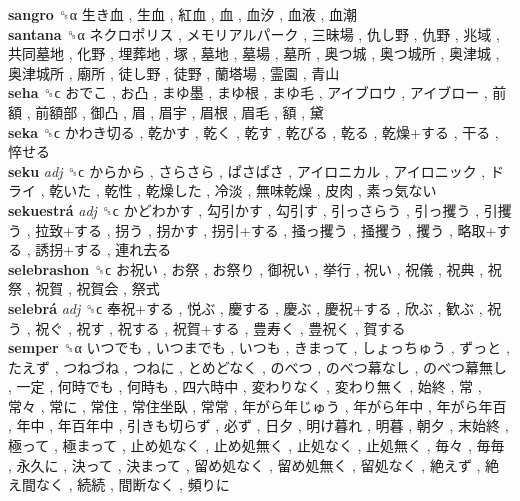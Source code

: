 \textbf{sangro} ␝α   生き血 ,  生血 ,  紅血 ,  血 ,  血汐 ,  血液 ,  血潮   \\
\textbf{santana} ␝α   ネクロポリス ,  メモリアルパーク ,  三昧場 ,  仇し野 ,  仇野 ,  兆域 ,  共同墓地 ,  化野 ,  埋葬地 ,  塚 ,  墓地 ,  墓場 ,  墓所 ,  奥つ城 ,  奥つ城所 ,  奥津城 ,  奥津城所 ,  廟所 ,  徒し野 ,  徒野 ,  蘭塔場 ,  霊園 ,  青山   \\
\textbf{seha} ␝ϲ   おでこ ,  お凸 ,  まゆ墨 ,  まゆ根 ,  まゆ毛 ,  アイブロウ ,  アイブロー ,  前額 ,  前額部 ,  御凸 ,  眉 ,  眉宇 ,  眉根 ,  眉毛 ,  額 ,  黛   \\
\textbf{seka} ␝ϲ   かわき切る ,  乾かす ,  乾く ,  乾す ,  乾びる ,  乾る ,  乾燥+する ,  干る ,  悴せる   \\
\textbf{seku} \emph{adj}  ␝ϲ   からから ,  さらさら ,  ぱさぱさ ,  アイロニカル ,  アイロニック ,  ドライ ,  乾いた ,  乾性 ,  乾燥した ,  冷淡 ,  無味乾燥 ,  皮肉 ,  素っ気ない   \\
\textbf{sekuestrá} \emph{adj}  ␝ϲ   かどわかす ,  勾引かす ,  勾引す ,  引っさらう ,  引っ攫う ,  引攫う ,  拉致+する ,  拐う ,  拐かす ,  拐引+する ,  掻っ攫う ,  掻攫う ,  攫う ,  略取+する ,  誘拐+する ,  連れ去る   \\
\textbf{selebrashon} ␝ϲ   お祝い ,  お祭 ,  お祭り ,  御祝い ,  挙行 ,  祝い ,  祝儀 ,  祝典 ,  祝祭 ,  祝賀 ,  祝賀会 ,  祭式   \\
\textbf{selebrá} \emph{adj}  ␝ϲ   奉祝+する ,  悦ぶ ,  慶する ,  慶ぶ ,  慶祝+する ,  欣ぶ ,  歓ぶ ,  祝う ,  祝ぐ ,  祝す ,  祝する ,  祝賀+する ,  豊寿く ,  豊祝く ,  賀する   \\
\textbf{semper} ␝α   いつでも ,  いつまでも ,  いつも ,  きまって ,  しょっちゅう ,  ずっと ,  たえず ,  つねづね ,  つねに ,  とめどなく ,  のべつ ,  のべつ幕なし ,  のべつ幕無し ,  一定 ,  何時でも ,  何時も ,  四六時中 ,  変わりなく ,  変わり無く ,  始終 ,  常 ,  常々 ,  常に ,  常住 ,  常住坐臥 ,  常常 ,  年がら年じゅう ,  年がら年中 ,  年がら年百 ,  年中 ,  年百年中 ,  引きも切らず ,  必ず ,  日夕 ,  明け暮れ ,  明暮 ,  朝夕 ,  末始終 ,  極って ,  極まって ,  止め処なく ,  止め処無く ,  止処なく ,  止処無く ,  毎々 ,  毎毎 ,  永久に ,  決って ,  決まって ,  留め処なく ,  留め処無く ,  留処なく ,  絶えず ,  絶え間なく ,  続続 ,  間断なく ,  頻りに   \\
